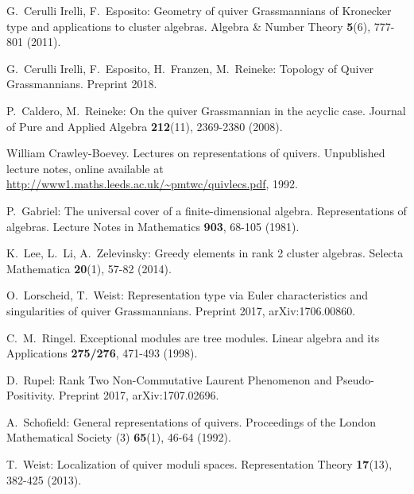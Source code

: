 \documentclass{amsart}
\numberwithin{equation}{section}
\begin{document}
\begin{thebibliography}{10}
  G.~Cerulli Irelli, F.~Esposito: Geometry of quiver Grassmannians of Kronecker type and applications to cluster algebras. Algebra \&  Number Theory \textbf{5}(6), 777-801 (2011).

  G.~Cerulli Irelli, F.~Esposito, H.~Franzen, M.~Reineke: Topology of Quiver Grassmannians. Preprint 2018.

  P.~Caldero, M.~Reineke: On the quiver Grassmannian in the acyclic case. Journal of Pure and Applied Algebra \textbf{212}(11), 2369-2380 (2008).

William Crawley-Boevey. Lectures on representations of quivers. Unpublished lecture notes, online available at \url{http://www1.maths.leeds.ac.uk/~pmtwc/quivlecs.pdf}, 1992.
	

  P.~Gabriel: The universal cover of a finite-dimensional algebra. Representations of algebras. Lecture Notes in Mathematics {\bf 903}, 68-105 (1981).

  K.~Lee, L.~Li, A.~Zelevinsky: Greedy elements in rank 2 cluster algebras. Selecta Mathematica \textbf{20}(1), 57-82 (2014).

  O.~Lorscheid, T.~Weist: Representation type via Euler characteristics and singularities of quiver Grassmannians. Preprint 2017, arXiv:1706.00860.

  C.~M.~Ringel. Exceptional modules are tree modules. Linear algebra and its Applications \textbf{275/276}, 471-493 (1998).

  D.~Rupel: Rank Two Non-Commutative Laurent Phenomenon and Pseudo-Positivity. Preprint 2017, arXiv:1707.02696.

  A.~Schofield: General representations of quivers. Proceedings of the London Mathematical Society (3) \textbf{65}(1), 46-64 (1992).

  T.~Weist: Localization of quiver moduli spaces. Representation Theory \textbf{17}(13), 382-425 (2013).

\end{thebibliography}
\end{document}
